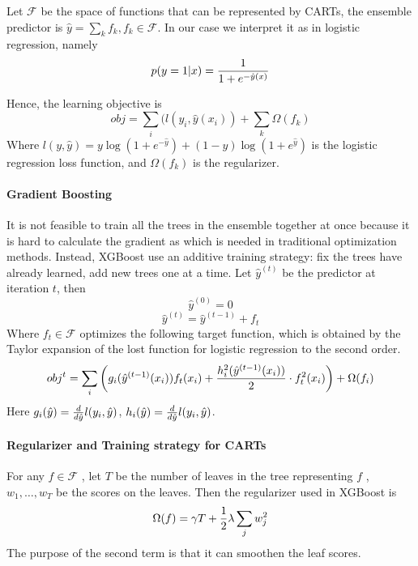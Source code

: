\documentclass[11pt]{article}
\theoremstyle{plain}
\theoremstyle{definition}
\theoremstyle{remark}
\begin{document}
\noindent Let $\mathcal{F}$ be the space of functions that can be represented by CARTs, the ensemble predictor is $\hat{y}=\sum_k f_k, f_k\in\mathcal{F}$. In our case we interpret it as in logistic regression, namely
\begin{equation}
p(y=1|x)={1\over 1+e^{-\hat{y}(x)}}
\end{equation}

\noindent Hence, the learning objective is
\begin{equation}
obj=\sum_i(l(y_i,\hat{y}(x_i))+\sum_k\Omega(f_k)
\end{equation}
Where $l(y,\hat{y})=y\log(1+e^{-\hat{y}})+(1-y)\log(1+e^{\hat{y}})$ is the logistic regression loss function, and $\Omega(f_k)$ is the regularizer.

\paragraph{Gradient Boosting}
It is not feasible to train all the trees in the ensemble together at once because it is hard to calculate the gradient as which is needed in traditional optimization methods. Instead, XGBoost use an additive training strategy: fix the trees have already learned, add new trees one at a time. Let $\hat{y}^{(t)}$ be the predictor at iteration $t$, then
\begin{equation}
\hat{y}^{(0)}=0
\end{equation}
\begin{equation}
\hat{y}^{(t)}=\hat{y}^{(t-1)}+f_t
\end{equation}
Where $f_t\in\mathcal{F}$ optimizes the following target function, which is obtained by the Taylor expansion of the lost function for logistic regression to the second order.
\begin{equation}
obj^t=\sum_i\left(g_i(\hat{y}^{(t-1)}(x_i))f_t(x_i)+{h_i^2(\hat{y}^{(t-1)}(x_i))\over 2}\cdot f_t^2(x_i)\right)+\Omega(f_i)
\end{equation}
Here $g_i(\hat{y})={d\over d\hat{y}}l(y_i,\hat{y})$, $h_i(\hat{y})={d\over d\hat{y}}l(y_i,\hat{y})$.

\paragraph{Regularizer and Training strategy for CARTs}

For any $f\in\mathcal{F}$ , let $T$ be the number of leaves in the tree representing $f$ , $w_1,\dots, w_T$ be the scores on
the leaves. Then the regularizer used in XGBoost is
\begin{equation}
\Omega(f)=\gamma T+{1\over 2}\lambda\sum_j w_j^2
\end{equation}
The purpose of the second term is that it can smoothen the leaf scores.\\
\end{document}
